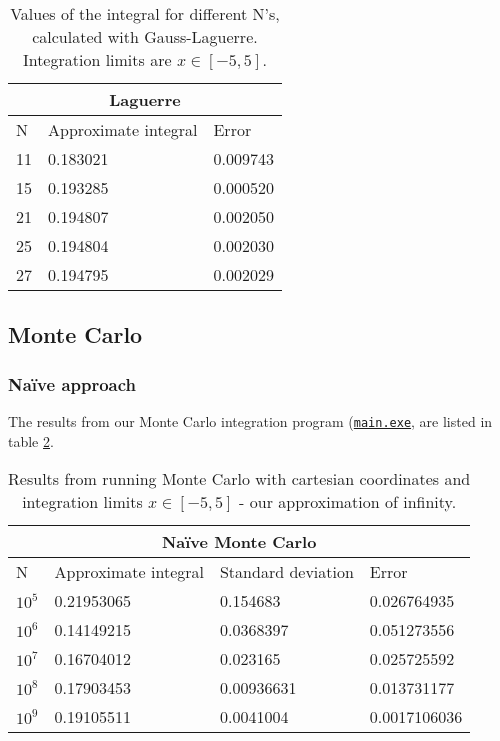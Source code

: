 \documentclass[../main.tex]{subfiles}
\begin{document}
\begin{table}[h!]
\begin{center}
\begin{tabular}{ |p{1cm}|p{4cm}|p{3cm}|}
 \hline
 \multicolumn{3}{|c|}{\textbf{Laguerre}} \\
 \hline
       N   & Approximate integral & Error\\
 \hline
 11 &  0.183021 &  0.009743\\
 15 &  0.193285 &  0.000520\\
 21 &  0.194807 &  0.002050\\
 25 &  0.194804 &  0.002030\\
 27 &  0.194795 &  0.002029\\

 \hline
\end{tabular}
\caption{Values of the integral for different N's, calculated with Gauss-Laguerre. Integration limits are $x\in[-5,5]$.}
\label{tab:res-gaulag}
\end{center}
\end{table}

\FloatBarrier

\subsection{Monte Carlo}
\subsubsection{Naïve approach}
The results from our Monte Carlo integration program (\href{https://github.com/kmaasrud/Project-3/blob/master/code/Monte-Carlo/main.exe}{\texttt{main.exe}}, are listed in table \ref{tab:res-naive}.

\begin{table}[h!]
  \begin{center}
    \begin{tabular}{|p{1cm}|p{3.5cm}|p{3cm}|p{3cm}|}
     \hline
     \multicolumn{4}{|c|}{\textbf{Naïve Monte Carlo}} \\
     \hline
           N   & Approximate integral & Standard deviation & Error\\
     \hline
     $10^5$ &  0.21953065 &  0.154683 & 0.026764935\\
     $10^6$ &  0.14149215 &  0.0368397 & 0.051273556\\
     $10^7$ &  0.16704012 &  0.023165 & 0.025725592\\
     $10^8$ &  0.17903453 &  0.00936631 & 0.013731177\\
     $10^9$ &  0.19105511 &  0.0041004 & 0.0017106036\\

     \hline
    \end{tabular}
    \caption{Results from running Monte Carlo with cartesian coordinates and integration limits $x\in[-5,5]$ - our approximation of infinity.}
    \label{tab:res-naive}
  \end{center}
\end{table}
\end{document}
